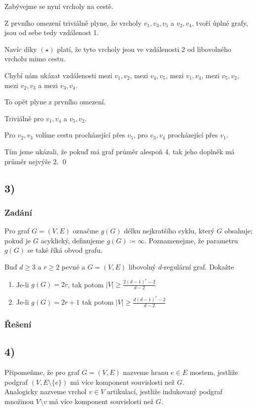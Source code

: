 \documentclass[../main.tex]{subfiles}
\begin{document}
Zabývejme se nyní vrcholy na cestě.

Z prvního omezení triviálně plyne, že vrcholy $v_1, v_3, v_5$  a $v_2, v_4$,
tvoří úplné grafy, jsou od sebe tedy vzdálenost 1. 

Navíc díky $(\star)$ platí, že tyto  
vrcholy jsou ve vzdálenosti 2 od libovolného vrcholu mimo cestu. 


Chybí nám ukázat vzdálenosti mezi $v_1,v_2$, mezi $v_4,v_5$, mezi $v_1, v_4$, mezi $v_5, v_2$, mezi $v_2, v_3$ a mezi $v_3, v_4$.

To opět plyne z prvního omezení.

Triviálně pro $v_1, v_4$ a $v_5, v_2$.

Pro $v_2, v_3$ volíme cestu procházející přes $v_5$, pro $v_3, v_4$ procházející přes $v_1$.

Tím jsme ukázali, že pokuď má graf průměr alespoň 4, tak jeho doplněk má průměr nejvýše 2.
\qed




\subsection{3)}
\subsubsection*{Zadání}
Pro graf $G=(V,E)$ označme $g(G)$ délku nejkratšího cyklu, který $G$ obsahuje; pokud je $G$ acyklický, definujeme $g(G)\coloneq \infty$.
Poznamenejme, že parametru $g(G)$ se také říká obvod grafu.

Buď $d\geq 3$ a $r\geq 2$ pevné a $G=(V,E)$ libovolný $d$-regulární graf. Dokažte
\begin{enumerate}
    \item Je-li $g(G)=2r$, tak  potom $|V| \geq \frac{2(d-1)^r -2}{d-2}$
    \item Je-li $g(G) = 2r + 1$ tak potom $|V|\geq \frac{d(d-1)^r -2}{d-2}$
\end{enumerate}

\subsubsection*{Řešení}


\subsection{4)}
Připomeňme, že pro graf $G=(V,E)$ nazveme hranu $e\in E$ mostem, jestliže podgraf $(V,E\setminus\{e\})$ má více komponent souvislosti než $G$.\\
Analogicky nazveme vrchol $v\in V$ artikulací, jestliže indukovaný podgraf množinou $V\setminus{v}$ má více komponent souvislosti než $G$.
\end{document}
